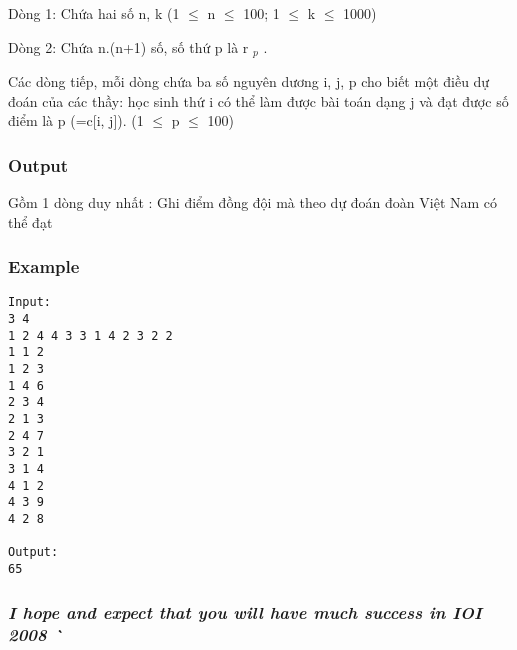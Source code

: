 Dòng 1: Chứa hai số n, k (1  $\le$  n  $\le$  100; 1  $\le$  k  $\le$  1000)

Dòng 2: Chứa n.(n+1) số, số thứ p là r $_ p $ .

Các dòng tiếp, mỗi dòng chứa ba số nguyên dương i, j, p cho biết một điều dự đoán của các thầy: học sinh thứ i có thể làm được bài toán dạng j và đạt được số điểm là p (=c[i, j]). (1  $\le$  p  $\le$  100)

\subsubsection{Output}

Gồm 1 dòng duy nhất : Ghi điểm đồng đội mà theo dự đoán đoàn Việt Nam có thể đạt

\subsubsection{Example}
\begin{verbatim}
Input:
3 4
1 2 4 4 3 3 1 4 2 3 2 2
1 1 2
1 2 3
1 4 6
2 3 4
2 1 3
2 4 7
3 2 1
3 1 4
4 1 2
4 3 9
4 2 8

Output:
65
\end{verbatim}

\subsubsection{\emph{I hope and expect that you will have much success in IOI 2008 ^^ }}
